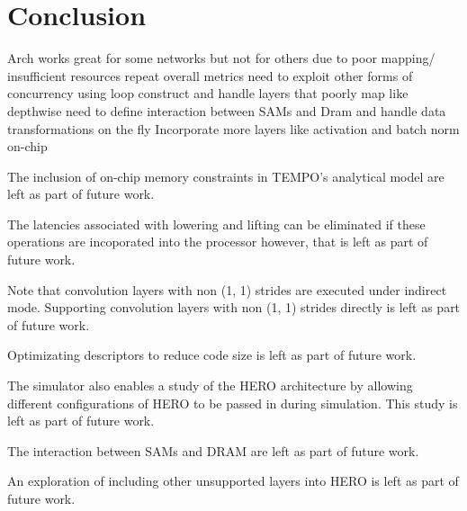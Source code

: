 \chapter{Conclusion}
\label{chap:conclude}

Arch works great for some networks but not for others due to poor mapping/ insufficient resources
repeat overall metrics
need to exploit other forms of concurrency using loop construct and handle layers that poorly map like depthwise
need to define interaction between SAMs and Dram and handle data transformations on the fly
Incorporate more layers like activation and batch norm on-chip


The inclusion of on-chip memory constraints in TEMPO's analytical model
are left as part of future work.  

The latencies associated with lowering and
lifting can be eliminated if these operations are incoporated into the processor
however, that is left as part of future work. 

Note that convolution layers with
non (1, 1) strides are executed under indirect mode. Supporting convolution layers
with non (1, 1) strides directly is left as part of future work.

Optimizating descriptors to
reduce code size is left as part of future work.

The simulator also enables a study of the HERO
architecture by allowing different configurations of HERO to be passed in during
simulation. This study is left as part of future work.

The interaction between SAMs and DRAM are left as part of future work. 

An
exploration of including other unsupported layers into HERO is left as part of
future work.  